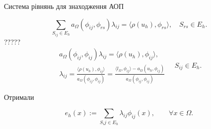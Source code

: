 \begin{frame}{Система рівнянь для знаходження АОП}

	\begin{equation}\label{eq:AEE_system}
		\sum \limits_{S_{ij} \in E_h} a_\Omega(\phi_{ij}, \phi_{rs}) \lambda_{ij} = \langle \rho(u_h), \phi_{rs} \rangle, \quad S_{rs} \in E_h.
	\end{equation}
	{\huge{?????}}
	\begin{equation}
		\begin{split}
			a_\Omega(\phi_{ij}, \phi_{ij}) \lambda_{ij} = \langle \rho(u_h), \phi_{ij} \rangle ,\\
			\lambda_{ij} = \frac{\langle \rho(u_h), \phi_{ij} \rangle}{a_\Omega(\phi_{ij}, \phi_{ij})}
				= \frac{\langle l_\Omega, \phi_{ij}\rangle - a_\Omega(u_h, \phi_{ij})}{a_\Omega(\phi_{ij}, \phi_{ij})}
		\end{split}
		\quad S_{ij} \in E_h.
	\end{equation}

	Отримали

	\begin{equation}\label{eq:AEE_final}
		e_h(x) := \sum \limits_{S_ij \in E_h} \lambda_{ij} \phi_{ij}(x), \qquad \forall x \in \Omega.
	\end{equation}

\end{frame}
